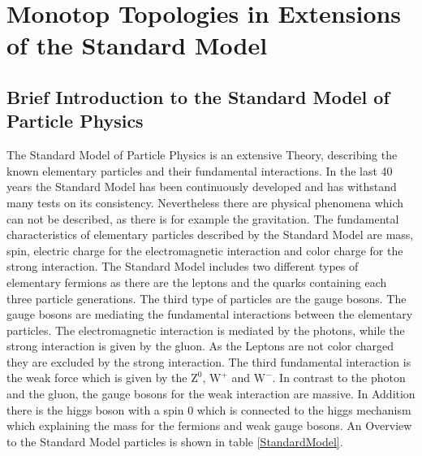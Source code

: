 \chapter{Monotop Topologies in Extensions of the Standard Model}

\section{Brief Introduction to the Standard Model of Particle Physics}
The Standard Model of Particle Physics is an extensive Theory, describing the known elementary particles and their fundamental interactions.
In the last 40 years the Standard Model has been continuously developed and has withstand many tests on its consistency.
Nevertheless there are physical phenomena which can not be described, as there is for example the gravitation.
The fundamental characteristics of elementary particles described by the Standard Model are mass, spin, electric charge for the electromagnetic interaction and color charge for the strong interaction.
The Standard Model includes two different types of elementary fermions as there are the leptons and the quarks containing each three particle generations.
The third type of particles are the gauge bosons.
The gauge bosons are mediating the fundamental interactions between the elementary particles.
The electromagnetic interaction is mediated by the photons, while the strong interaction is given by the gluon.
As the Leptons are not color charged they are excluded by the strong interaction.
The third fundamental interaction is the weak force which is given by the $\mathrm{Z^0}$, $\mathrm{W^+}$ and $\mathrm{W^-}$.
In contrast to the photon and the gluon, the gauge bosons for the weak interaction are massive.
In Addition there is the higgs boson with a spin 0 which is connected to the higgs mechanism which explaining the mass for the fermions and weak gauge bosons.
An Overview to the Standard Model particles is shown in table \ref{StandardModel}.

